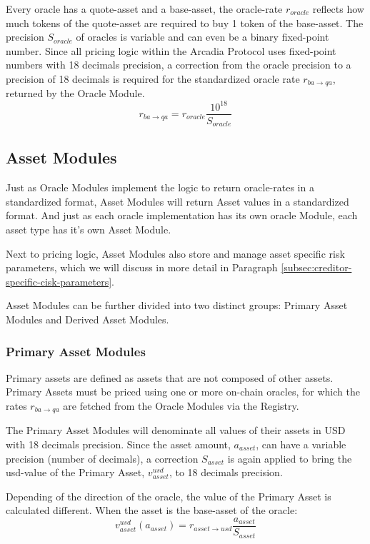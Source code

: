 \documentclass[sigconf,nonacm]{acmart}
\begin{document}
Every oracle has a quote-asset and a base-asset, the oracle-rate $r_{oracle}$ reflects how much tokens of the quote-asset are required to buy 1 token of the base-asset.
The precision $S_{oracle}$ of oracles is variable and can even be a binary fixed-point number.
Since all pricing logic within the Arcadia Protocol uses fixed-point numbers with 18 decimals precision,
a correction from the oracle precision to a precision of 18 decimals is required for the standardized oracle rate $r_{ba\rightarrow qa}$, returned by the Oracle Module.
\begin{equation}
    \label{eq:oracle-module}
    r_{ba\rightarrow qa} = r_{oracle} \frac{10^{18}}{S_{oracle}}
\end{equation}

\subsection{Asset Modules}
Just as Oracle Modules implement the logic to return oracle-rates in a standardized format, Asset Modules will return Asset values in a standardized format.
And just as each oracle implementation has its own oracle Module, each asset type has it's own Asset Module.

Next to pricing logic, Asset Modules also store and manage asset specific risk parameters, which we will discuss in more detail in Paragraph \ref{subsec:creditor-specific-cisk-parameters}.

Asset Modules can be further divided into two distinct groups: Primary Asset Modules and Derived Asset Modules.

\subsubsection{Primary Asset Modules}
Primary assets are defined as assets that are not composed of other assets.
Primary Assets must be priced using one or more on-chain oracles, for which the rates $r_{ba\rightarrow qa}$ are fetched from the Oracle Modules via the Registry.

The Primary Asset Modules will denominate all values of their assets in USD with 18 decimals precision.
Since the asset amount, $a_{asset}$, can have a variable precision (number of decimals),
a correction $S_{asset}$ is again applied to bring the usd-value of the Primary Asset, $v_{asset}^{usd}$, to 18 decimals precision.

Depending of the direction of the oracle, the value of the Primary Asset is calculated different.
When the asset is the base-asset of the oracle:
\begin{equation}
    v^{usd}_{asset}(a_{asset}) = r_{asset\rightarrow usd} \frac{a_{asset}}{S_{asset}}
\end{equation}
\end{document}
